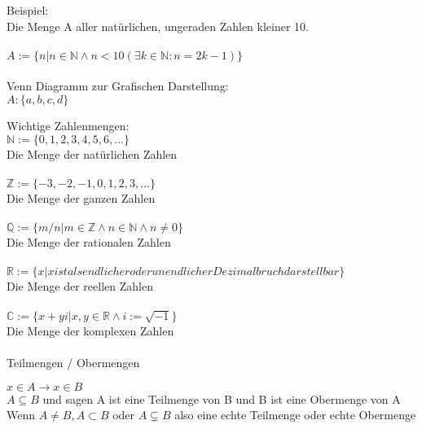 \documentclass[../gruppenarbeit_1.tex]{subfiles}
\begin{document}
Beispiel:\\
Die Menge A aller natürlichen, ungeraden Zahlen kleiner 10.\\
\\
$A := \{n | n \in \mathbb{N} \wedge n < 10 (\exists k \in \mathbb{N} : n = 2k-1)\}$\\
\\

Venn Diagramm zur Grafischen Darstellung:\\
$A : \{a,b,c,d\}$\\



Wichtige Zahlenmengen:\\
$\mathbb{N} := \{0,1,2,3,4,5,6,...\}$\\
Die Menge der natürlichen Zahlen\\
\\
$\mathbb{Z} := \{-3,-2,-1,0,1,2,3,...\}$\\
Die Menge der ganzen Zahlen\\
\\
$\mathbb{Q} := \{m/n | m \in \mathbb{Z} \wedge n \in \mathbb{N} \wedge n \ne 0\}$\\
Die Menge der rationalen Zahlen\\
\\

$\mathbb{R} := \{x | x ist als endlicher oder unendlicher Dezimalbruch darstellbar\}$\\
Die Menge der reellen Zahlen\\
\\

$\mathbb{C} := \{x+yi | x,y \in \mathbb{R} \wedge i := \sqrt{-1}\}$\\
Die Menge der komplexen Zahlen\\
\\

Teilmengen / Obermengen

$x \in A \rightarrow x \in B$\\
$A \subseteq B$ und sagen A ist eine Teilmenge von B und B ist eine Obermenge von A\\

Wenn $A \ne B, A \subset B$ oder $A \subsetneq B$ also eine echte Teilmenge oder echte Obermenge\\
\end{document}
